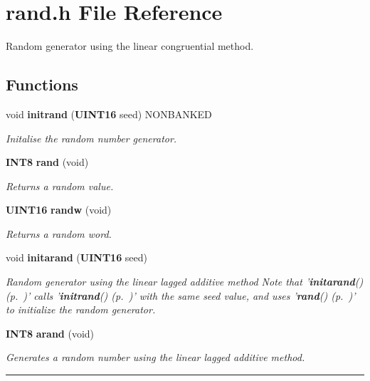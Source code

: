 \section{rand.h File Reference}
\label{rand.h}
Random generator using the linear congruential method. 


\subsection*{Functions}
\begin{CompactItemize}
\item 
void {\bf initrand} ({\bf UINT16} seed) NONBANKED
\begin{CompactList}\small\item\em Initalise the random number generator.\item\end{CompactList}

\item 
\label{rand.h_a1}
{\bf INT8} {\bf rand} (void)
\begin{CompactList}\small\item\em Returns a random value.\item\end{CompactList}

\item 
\label{rand.h_a2}
{\bf UINT16} {\bf randw} (void)
\begin{CompactList}\small\item\em Returns a random word.\item\end{CompactList}

\item 
void {\bf initarand} ({\bf UINT16} seed)
\begin{CompactList}\small\item\em Random generator using the linear lagged additive method Note that '{\bf initarand}() {\rm (p.~\pageref{rand.h_a3})}' calls '{\bf initrand}() {\rm (p.~\pageref{rand.h_a0})}' with the same seed value, and uses '{\bf rand}() {\rm (p.~\pageref{rand.h_a1})}' to initialize the random generator.\item\end{CompactList}

\item 
\label{rand.h_a4}
{\bf INT8} {\bf arand} (void)
\begin{CompactList}\small\item\em Generates a random number using the linear lagged additive method.\item\end{CompactList}

\end{CompactItemize}
\vspace{0.4cm}\hrule\vspace{0.2cm}

